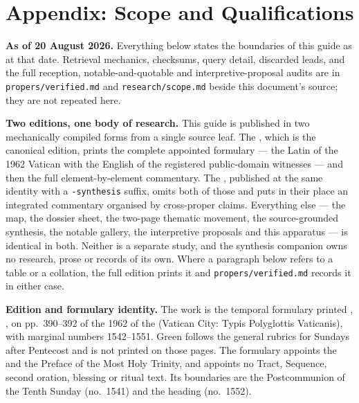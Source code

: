 \sectionguard
\section*{Appendix: Scope and Qualifications}

\textbf{As of 20 August 2026.} Everything below states the boundaries of this
guide as at that date. Retrieval mechanics, checksums, query detail, discarded
leads, and the full reception, notable-and-quotable and interpretive-proposal
audits are in \texttt{propers/verified.md} and \texttt{research/scope.md}
beside this document's source; they are not repeated here.

\textbf{Two editions, one body of research.} This guide is published in two
mechanically compiled forms from a single source leaf. The ,
which is the canonical edition, prints the complete appointed formulary --- the
Latin of the 1962 Vatican  with the English of the
registered public-domain witnesses --- and then the full element-by-element
commentary. The , published at the same identity with a
\texttt{-synthesis} suffix, omits both of those and puts in their place an
integrated commentary organised by cross-proper claims. Everything else ---
the map, the dossier sheet, the two-page thematic movement, the source-grounded
synthesis, the notable gallery, the interpretive proposals and this apparatus
--- is identical in both. Neither is a separate study, and the synthesis
companion owns no research, prose or records of its own. Where a paragraph
below refers to a table or a collation, the full edition prints it and
\texttt{propers/verified.md} records it in either case.

\textbf{Edition and formulary identity.} The work is the temporal formulary
printed , , on pp.\
390--392 of the 1962  of the 
(Vatican City: Typis Polyglottis Vaticanis), with marginal numbers 1542--1551.
Green follows the general rubrics for Sundays after Pentecost and is not
printed on those pages. The formulary appoints the \latin{Credo} and the
Preface of the Most Holy Trinity, and appoints no Tract, Sequence, second
oration, blessing or ritual text. Its boundaries are the Postcommunion of the
Tenth Sunday (no.\ 1541) and the heading \latin{DOMINICA DUODECIMA post
Pentecosten} (no.\ 1552).

